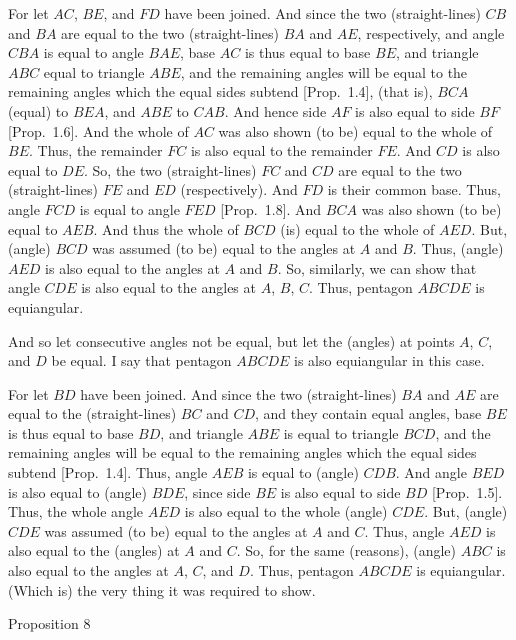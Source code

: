 For let $AC$, $BE$, and $FD$ have been joined. And since the two (straight-lines) $CB$ and $BA$ are equal to the two (straight-lines) $BA$ and
$AE$, respectively, and angle $CBA$ is equal to angle $BAE$,  base
$AC$ is thus equal to base $BE$, and triangle $ABC$  equal to triangle
$ABE$, and the remaining angles will be equal to the remaining angles
which the equal sides subtend [Prop.~1.4],  (that is), $BCA$ (equal) to $BEA$, and $ABE$ to $CAB$. And hence side $AF$ is also equal to side $BF$ [Prop.~1.6]. And the whole  of $AC$ was also shown (to be) equal to
the whole of $BE$. Thus, the remainder $FC$ is also equal to the remainder $FE$.
And $CD$ is also equal to $DE$. So, the two (straight-lines) $FC$ and
$CD$ are equal to the two (straight-lines) $FE$ and $ED$ (respectively). 
And $FD$ is their common base. Thus, angle $FCD$ is equal to angle
$FED$ [Prop.~1.8]. And $BCA$ was also shown (to be) equal to 
$AEB$. And thus the whole of  $BCD$ (is) equal to the whole of $AED$.
But, (angle) $BCD$ was assumed (to be) equal to the angles at $A$ and
$B$. Thus, (angle) $AED$ is also equal to the angles at $A$ and $B$. So, 
similarly, we can show that angle $CDE$ is also equal to the angles
at $A$, $B$, $C$. Thus, pentagon $ABCDE$ is equiangular.

And so let consecutive  angles not be equal, but let
the (angles) at points $A$, $C$, and $D$ be equal. I say that pentagon $ABCDE$ is also
equiangular in this case.

For let $BD$ have been joined. And since the two (straight-lines) $BA$
and $AE$ are equal to the (straight-lines) $BC$ and $CD$, and they contain
equal angles,   base $BE$ is thus equal to base $BD$, and triangle $ABE$
is equal to triangle $BCD$, and the remaining angles will be equal
to the remaining angles which the equal sides subtend [Prop.~1.4]. 
Thus, angle $AEB$ is equal to (angle) $CDB$. And angle $BED$
is also equal to (angle) $BDE$,  since side $BE$ is also equal to side
$BD$ [Prop.~1.5]. Thus, the whole angle $AED$ is also equal to the
whole (angle) $CDE$. But, (angle) $CDE$ was assumed (to be) equal
to the angles at $A$ and $C$.  Thus, angle $AED$ is also equal to the (angles)
at $A$ and $C$. So, for the same (reasons), (angle) $ABC$ is also equal
to the angles at  $A$, $C$, and $D$. Thus, pentagon $ABCDE$ is equiangular.
(Which is) the very thing it was required to show.


\begin{center}
{\large Proposition 8}
\end{center}

